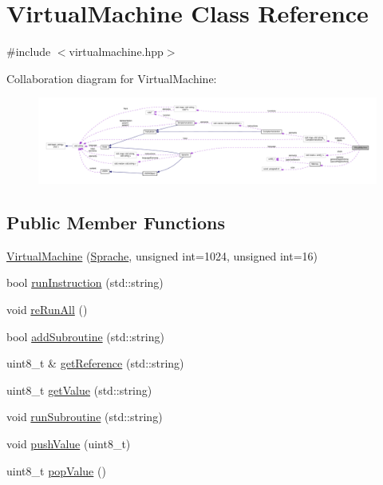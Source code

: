 \hypertarget{class_virtual_machine}{}\section{Virtual\+Machine Class Reference}
\label{class_virtual_machine}


{\ttfamily \#include $<$virtualmachine.\+hpp$>$}



Collaboration diagram for Virtual\+Machine\+:
\nopagebreak
\begin{figure}[H]
\begin{center}
\leavevmode
\includegraphics[width=350pt]{class_virtual_machine__coll__graph}
\end{center}
\end{figure}
\subsection*{Public Member Functions}
\begin{DoxyCompactItemize}
\item 
\mbox{\hyperlink{class_virtual_machine_aaaef932333f031a51e9aa16e93931edf}{Virtual\+Machine}} (\mbox{\hyperlink{class_sprache}{Sprache}}, unsigned int=1024, unsigned int=16)
\item 
bool \mbox{\hyperlink{class_virtual_machine_aabeb8078a57ca3bb98c24bc655296e9f}{run\+Instruction}} (std\+::string)
\item 
void \mbox{\hyperlink{class_virtual_machine_a572584de47b0e95303e71832b684175f}{re\+Run\+All}} ()
\item 
bool \mbox{\hyperlink{class_virtual_machine_a52907412b34a0b747bfaa26c48253aa9}{add\+Subroutine}} (std\+::string)
\item 
uint8\+\_\+t \& \mbox{\hyperlink{class_virtual_machine_a0f55b241f2e14264dfaec5449d136a50}{get\+Reference}} (std\+::string)
\item 
uint8\+\_\+t \mbox{\hyperlink{class_virtual_machine_a09bdaea77003f19912e0f101faefa26f}{get\+Value}} (std\+::string)
\item 
void \mbox{\hyperlink{class_virtual_machine_a564ba72b2d0f9e888a1560b523c567ba}{run\+Subroutine}} (std\+::string)
\item 
void \mbox{\hyperlink{class_virtual_machine_ac20f1d6667434866f50880187c521cd4}{push\+Value}} (uint8\+\_\+t)
\item 
uint8\+\_\+t \mbox{\hyperlink{class_virtual_machine_a4cbf0a06938ad9b3acb9a1872452e6a5}{pop\+Value}} ()
\end{DoxyCompactItemize}
